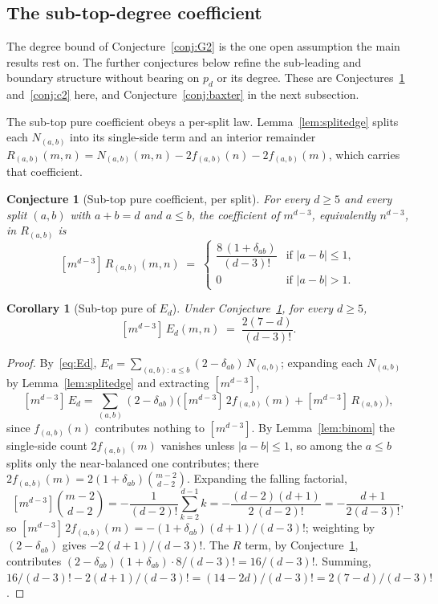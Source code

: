 \documentclass[11pt]{article}
\newtheorem{corollary}[theorem]{Corollary}
\newtheorem{conjecture}[theorem]{Conjecture}
\theoremstyle{definition}
\theoremstyle{remark}
\begin{document}
\subsection{The sub-top-degree coefficient}\label{subsec:subtop}

The degree bound of Conjecture~\ref{conj:G2} is the one open assumption the main
results rest on. The further conjectures below refine the sub-leading and boundary
structure without bearing on $p_d$ or its degree. These are Conjectures~\ref{conj:subtop}
and~\ref{conj:c2} here, and Conjecture~\ref{conj:baxter} in the next subsection.

The sub-top pure coefficient obeys a per-split law.
Lemma~\ref{lem:splitedge} splits each $N_{(a,b)}$ into its single-side term and
an interior remainder $R_{(a,b)}(m,n) = N_{(a,b)}(m,n) - 2f_{(a,b)}(n) - 2f_{(a,b)}(m)$,
which carries that coefficient.

\begin{conjecture}[Sub-top pure coefficient, per split]\label{conj:subtop}
For every $d\ge5$ and every split $(a,b)$ with $a+b=d$ and $a\le b$, the
coefficient of $m^{d-3}$, equivalently $n^{d-3}$, in $R_{(a,b)}$
is
\[
  [m^{d-3}]\,R_{(a,b)}(m,n) \;=\;
  \begin{cases}
    \dfrac{8\,(1+\delta_{ab})}{(d-3)!} & \text{if } |a-b|\le 1, \\[2pt]
    0 & \text{if } |a-b|>1.
  \end{cases}
\]
\end{conjecture}

\begin{corollary}[Sub-top pure of $E_d$]\label{cor:subtop}
Under Conjecture~\ref{conj:subtop}, for every $d\ge5$,
\[
  [m^{d-3}]\,E_d(m,n) \;=\; \frac{2(7-d)}{(d-3)!}.
\]
\end{corollary}

\begin{proof}
By~\eqref{eq:Ed}, $E_d = \sum_{(a,b):\,a\le b}
(2-\delta_{ab})\,N_{(a,b)}$; expanding each $N_{(a,b)}$ by
Lemma~\ref{lem:splitedge} and extracting $[m^{d-3}]$,
\[
  [m^{d-3}]\,E_d = \sum_{(a,b)} (2-\delta_{ab})\bigl(
     [m^{d-3}]\,2f_{(a,b)}(m) + [m^{d-3}]\,R_{(a,b)}
  \bigr),
\]
since $f_{(a,b)}(n)$ contributes nothing to $[m^{d-3}]$. By Lemma~\ref{lem:binom}
the single-side count $2f_{(a,b)}(m)$ vanishes unless $|a-b|\le1$, so among the
$a\le b$ splits only the near-balanced one contributes; there
$2f_{(a,b)}(m)=2(1+\delta_{ab})\binom{m-2}{d-2}$. Expanding the falling factorial,
\[
  [m^{d-3}]\binom{m-2}{d-2}=-\frac{1}{(d-2)!}\sum_{k=2}^{d-1}k
    =-\frac{(d-2)(d+1)}{2\,(d-2)!}=-\frac{d+1}{2(d-3)!},
\]
so $[m^{d-3}]\,2f_{(a,b)}(m)=-(1+\delta_{ab})(d+1)/(d-3)!$; weighting by
$(2-\delta_{ab})$ gives $-2(d+1)/(d-3)!$.
The $R$ term, by Conjecture~\ref{conj:subtop}, contributes
$(2-\delta_{ab})(1+\delta_{ab})\cdot 8/(d-3)! = 16/(d-3)!$. Summing,
$16/(d-3)! - 2(d+1)/(d-3)! = (14-2d)/(d-3)! = 2(7-d)/(d-3)!$.
\end{proof}
\end{document}
